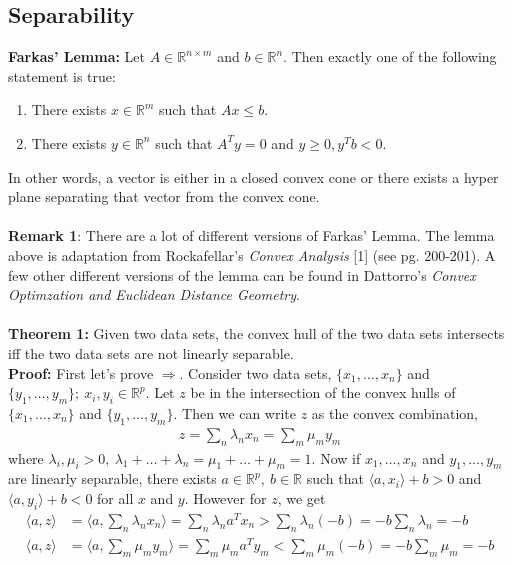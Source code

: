 \documentclass[11pt, a4paper]{article}
\begin{document}
\subsection{Separability}
\textbf{Farkas' Lemma: }Let $A \in \mathbb{R}^{n\times m}$ and $b \in \mathbb{R}^n$. Then exactly one of the following statement is true:
\begin{enumerate}
\item There exists $x \in \mathbb{R}^m$ such that $Ax \le b$.
\item There exists $y \in \mathbb{R}^n$ such that $A^Ty = 0$ and $y \ge 0, y^T b < 0$.
\end{enumerate}
In other words, a vector is either in a closed convex cone or there exists a hyper plane separating that vector from the convex cone.\\ \\
\textbf{Remark 1}: There are a lot of different versions of Farkas' Lemma. The lemma above is adaptation from Rockafellar's \textit{Convex Analysis} [1] (see pg. 200-201). A few other different versions of the lemma can be found in Dattorro's \textit{Convex Optimzation and Euclidean Distance Geometry}.\\ \\
\textbf{Theorem 1: } Given two data sets,  the convex hull of the two data sets intersects iff the two data sets are not linearly separable.\\
\textbf{Proof: }First let's prove $\Rightarrow$. Consider two data sets, $\{x_1,\ldots,x_n\}$ and $\{y_1,\ldots,y_m\};\ x_i,y_i\in \mathbb{R}^p$. Let $z$ be in the intersection of the convex hulls of $\{x_1,\ldots,x_n\}$ and $\{y_1,\ldots,y_m\}$. Then we can write $z$ as the convex combination,
\begin{align*}
z = \sum_n \lambda_n x_n = \sum_m \mu_m y_m
\end{align*}
where $\lambda_i,\mu_i > 0,\ \lambda_1+\ldots+\lambda_n = \mu_1+\ldots+\mu_m = 1$. Now if ${x_1,\ldots,x_n}$ and ${y_1,\ldots,y_m}$ are linearly separable, there exists $a \in \mathbb{R}^p,\ b\in \mathbb{R}$ such that $\langle a,x_i\rangle + b > 0 $ and $\langle a,y_i\rangle + b < 0 $ for all $x$ and $y$. However for $z$, we get
\begin{align*}
\langle a, z \rangle &= \langle a, \sum_n \lambda_n x_n \rangle = \sum_n \lambda_n a^Tx_n > \sum_n \lambda_n (-b) = -b\sum_n \lambda_n = -b \\
\langle a, z \rangle &= \langle a, \sum_m \mu_m y_m \rangle = \sum_m \mu_m a^Ty_m < \sum_m \mu_m (-b) = -b\sum_m \mu_m = -b
\end{align*}
\end{document}
